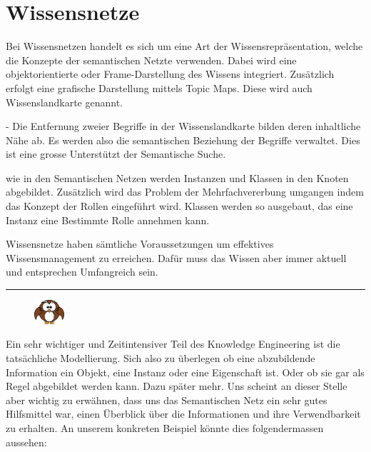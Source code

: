 \section{Wissensnetze}
\label{sec:wissensrepFormen_Wissensnetze}
Bei Wissensnetzen handelt es sich um eine Art der Wissensrepräsentation, welche die Konzepte der semantischen Netzte verwenden. Dabei wird eine objektorientierte oder Frame-Darstellung des Wissens integriert. Zusätzlich erfolgt eine grafische Darstellung mittels Topic Maps. Diese wird auch Wissenslandkarte genannt. 

- Die Entfernung zweier Begriffe in der Wissenslandkarte bilden deren inhaltliche Nähe ab. Es werden also die semantischen Beziehung der Begriffe verwaltet. Dies ist eine grosse Unterstützt der Semantische Suche.

wie in den Semantischen Netzen werden Instanzen und Klassen in den Knoten abgebildet. Zusätzlich wird das Problem der Mehrfachvererbung umgangen indem das Konzept der Rollen eingeführt wird. Klassen werden so ausgebaut, das eine Instanz eine Bestimmte Rolle annehmen kann.
	
Wissensnetze haben sämtliche Voraussetzungen um effektives Wissensmanagement zu erreichen. Dafür muss das Wissen aber immer aktuell und entsprechen Umfangreich sein.\\

\noindent\rule[1ex]{\textwidth}{1pt}
\vspace{0.1pt}
\begin{figure}
    \vspace{-19pt}
    \includegraphics[width=0.1\textwidth]{bilder/owl.png}
\end{figure}
Ein sehr wichtiger und Zeitintensiver Teil des Knowledge Engineering ist die tatsächliche Modellierung. Sich also zu überlegen ob eine abzubildende Information ein Objekt, eine Instanz oder eine Eigenschaft ist. Oder ob sie gar als Regel abgebildet werden kann. Dazu später mehr. Uns scheint an dieser Stelle aber wichtig zu erwähnen, dass uns das Semantischen Netz ein sehr gutes Hilfsmittel war, einen Überblick über die Informationen und ihre Verwendbarkeit zu erhalten.
An unserem konkreten Beispiel könnte dies folgendermassen aussehen: 

